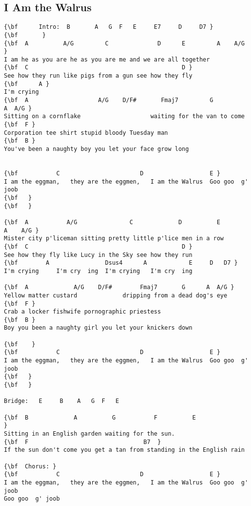 \documentclass[a4paper]{article}
\begin{document}
\subsection{I Am the Walrus}
\begin{Verbatim}[commandchars=\\\{\}]
{\bf  	  Intro:  B       A   G  F   E     E7     D     D7 }
{\bf       }
{\bf  A          A/G         C              D      E         A    A/G }
I am he as you are he as you are me and we are all together 
{\bf  C                                            D }
See how they run like pigs from a gun see how they fly 
{\bf      A }
I'm crying 
{\bf  A                    A/G    D/F#       Fmaj7         G          A  A/G }
Sitting on a cornflake                    waiting for the van to come 
{\bf  F }
Corporation tee shirt stupid bloody Tuesday man 
{\bf  B }
You've been a naughty boy you let your face grow long 


{\bf           C                       D                   E }
I am the eggman,   they are the eggmen,   I am the Walrus  Goo goo  g' joob
{\bf  ￼}
{\bf   }

{\bf  A           A/G               C             D          E        A    A/G }
Mister city p'liceman sitting pretty little p'lice men in a row 
{\bf  C                                            D }
See how they fly like Lucy in the Sky see how they run 
{\bf        A                Dsus4      A            E     D   D7 }
I'm crying     I'm cry  ing  I'm crying   I'm cry  ing 

{\bf  A             A/G    D/F#        Fmaj7       G      A  A/G }
Yellow matter custard             dripping from a dead dog's eye 
{\bf  F }
Crab a locker fishwife pornographic priestess  
{\bf  B }
Boy you been a naughty girl you let your knickers down 

{\bf  ￼￼}
{\bf           C                       D                   E }
I am the eggman,   they are the eggmen,   I am the Walrus  Goo goo  g' joob
{\bf  ￼}
{\bf   }

Bridge:   E     B    A   G  F   E 

{\bf  B             A          G           F          E                }
Sitting in an English garden waiting for the sun.        
{\bf  F                                 B7  }
If the sun don't come you get a tan from standing in the English rain   

{\bf  Chorus: }
{\bf           C                       D                   E }
I am the eggman,   they are the eggmen,   I am the Walrus  Goo goo  g' joob  
Goo goo  g' joob            


\end{Verbatim}
\end{document}
